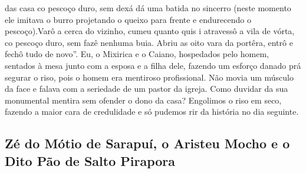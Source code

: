 \documentclass[12pt,brazil,]{book}
\begin{document}
das casa co pescoço duro, sem dexá dá uma batida no sincerro (neste
momento ele imitava o burro projetando o queixo para frente e
endurecendo o pescoço).Varô a cerca do vizinho, cumeu quanto quis i
atravessô a vila de vórta, co pescoço duro, sem fazê nenhuma buia. Abriu
as oito vara da portêra, entrô e fechô tudo de novo''. Eu, o Mixirica e
o Caiano, hospedados pelo homem, sentados à mesa junto com a esposa e a
filha dele, fazendo um esforço danado prá segurar o riso, pois o homem
era mentiroso profissional. Não movia um músculo da face e falava com a
seriedade de um pastor da igreja. Como duvidar da sua monumental mentira
sem ofender o dono da casa? Engolimos o riso em seco, fazendo a maior
cara de credulidade e só pudemos rir da história no dia seguinte.

\subsection{Zé do Mótio de Sarapuí, o Aristeu Mocho e o Dito Pão de
Salto
Pirapora}\label{zuxe9-do-muxf3tio-de-sarapuuxed-o-aristeu-mocho-e-o-dito-puxe3o-de-salto-pirapora}
\end{document}
